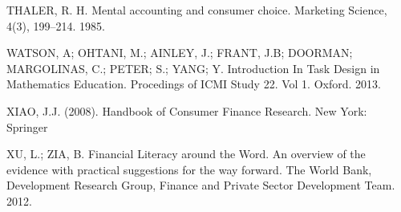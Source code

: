 THALER, R. H. Mental accounting and consumer choice. Marketing Science, 4(3), 199–214. 1985.

WATSON, A; OHTANI, M.; AINLEY, J.; FRANT, J.B; DOORMAN; MARGOLINAS, C.; PETER; S.; YANG; Y. Introduction In Task Design in Mathematics Education. Procedings of ICMI Study 22. Vol 1. Oxford. 2013.

XIAO, J.J. (2008). Handbook of Consumer Finance Research. New York: Springer

XU, L.; ZIA, B. Financial Literacy around the Word. An overview of the evidence with practical suggestions for the way forward. The World Bank, Development Research Group, Finance and Private Sector Development Team. 2012.



